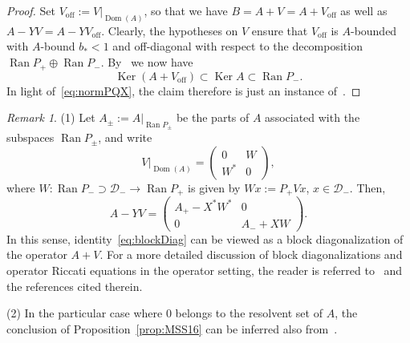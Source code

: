 \documentclass[11pt,a4paper]{amsart}
\numberwithin{equation}{section}
\DeclareMathOperator{\Ker}{Ker}
\DeclareMathOperator{\Ran}{Ran}
\DeclareMathOperator{\Dom}{Dom}
\newcommand{\cD}{{\mathcal D}}
\theoremstyle{plain}
\theoremstyle{definition}
\theoremstyle{remark}
\newtheorem{remark}[theorem]{Remark}
\begin{document}
\begin{proof}
  Set $V_{\text{off}} := V|_{\Dom(A)}$, so that we have $B = A+V = A+V_\text{off}$ as well as $A-YV = A-YV_\text{off}$. Clearly,
  the hypotheses on $V$ ensure that $V_\text{off}$ is $A$-bounded with $A$-bound $b_*<1$ and off-diagonal with respect to the
  decomposition $\Ran P_+\oplus\Ran P_-$. By~\cite[Lemma~6.3]{MSS16} we now have 
  \begin{equation*}
    \Ker(A+V_\text{off})
    \subset
    \Ker A
    \subset
    \Ran P_-
    .
  \end{equation*}
  In light of~\eqref{eq:normPQX}, the claim therefore is just an instance of~\cite[Theorem~6.1]{MSS16}.
\end{proof}%

\begin{remark}\label{rem:MSS16}
  (1)
  Let $A_\pm:=A|_{\Ran P_\pm}$ be the parts of $A$ associated with the subspaces $\Ran P_\pm$, and write
  \begin{equation*}
    V|_{\Dom(A)}
    =
    \begin{pmatrix} 0 & W\\ W^* & 0 \end{pmatrix}
    ,
  \end{equation*}
  where $W\colon \Ran P_-\supset\cD_-\to\Ran P_+$ is given by $Wx:=P_+Vx$, $x\in\cD_-$. Then,
  \begin{equation*}
    A - YV
    =
    \begin{pmatrix}
      A_+ - X^*W^* & 0\\
      0 & A_- + XW
    \end{pmatrix}
    .
  \end{equation*} 
  In this sense, identity~\eqref{eq:blockDiag} can be viewed as a block diagonalization of the operator $A+V$. For a more
  detailed discussion of block diagonalizations and operator Riccati equations in the operator setting, the reader is referred
  to~\cite{MSS16} and the references cited therein.

  (2)
  In the particular case where $0$ belongs to the resolvent set of $A$, the conclusion of Proposition~\ref{prop:MSS16} can be
  inferred also from~\cite[Theorems~2.7.21 and~2.8.5]{Tre08}.
\end{remark}
\end{document}
